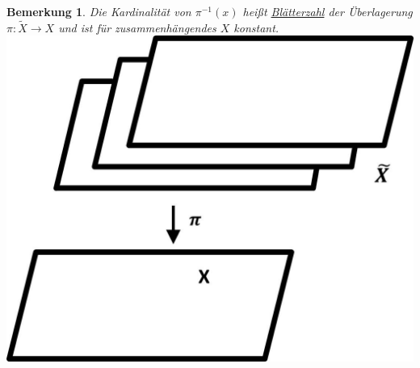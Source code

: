\documentclass[a4paper,11pt,notitlepage]{report}
\newtheorem{remark}{Bemerkung}[chapter]
\begin{document}
\begin{remark}
	Die Kardinalität von $\pi^{-1}(x)$ heißt \underline{Blätterzahl} der Überlagerung $\pi \colon \tilde{X} \rightarrow X$ und ist für zusammenhängendes $X$ konstant.
	\newline \includegraphics[scale=0.4]{images/Blaetterzahl.jpg}
\end{remark}
\end{document}
